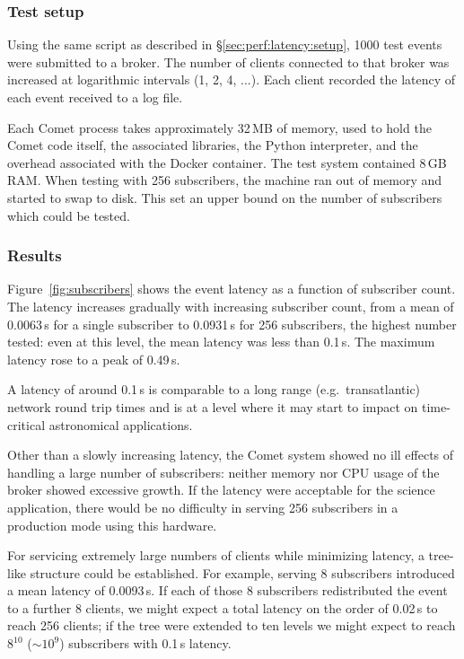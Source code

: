 \documentclass[5p,authoryear]{elsarticle}
\begin{document}
\subsubsection{Test setup}

Using the same script as described in \S\ref{sec:perf:latency:setup}, 1000
test events were submitted to a broker. The number of clients connected to
that broker was increased at logarithmic intervals (1, 2, 4, ...). Each client
recorded the latency of each event received to a log file.

Each Comet process takes approximately 32\,MB of memory, used to hold the
Comet code itself, the associated libraries, the Python interpreter, and the
overhead associated with the Docker container. The test system contained 8\,GB
RAM\@. When testing with 256 subscribers, the machine ran out of memory and
started to swap to disk. This set an upper bound on the number of subscribers
which could be tested.

\subsubsection{Results}

Figure~\ref{fig:subscribers} shows the event latency as a function of
subscriber count. The latency increases gradually with increasing subscriber
count, from a mean of 0.0063\,s for a single subscriber to 0.0931\,s for 256
subscribers, the highest number tested: even at this level, the mean latency
was less than 0.1\,s. The maximum latency rose to a peak of 0.49\,s.

A latency of around 0.1\,s is comparable to a long range (e.g.\ transatlantic)
network round trip times and is at a level where it may start to impact on
time-critical astronomical applications.

Other than a slowly increasing latency, the Comet system showed no
ill effects of handling a large number of subscribers: neither memory nor CPU
usage of the broker showed excessive growth. If the latency were acceptable
for the science application, there would be no difficulty in serving 256
subscribers in a production mode using this hardware.

For servicing extremely large numbers of clients while minimizing latency, a
tree-like structure could be established. For example, serving 8 subscribers
introduced a mean latency of 0.0093\,s. If each of those 8 subscribers
redistributed the event to a further 8 clients, we might expect a total
latency on the order of 0.02\,s to reach 256 clients; if the tree were
extended to ten levels we might expect to reach $8^{10}$ ($\sim10^9$)
subscribers with 0.1\,s latency.
\end{document}
